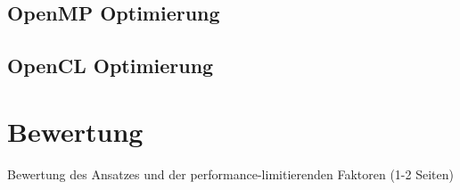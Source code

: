 \subsection*{OpenMP Optimierung}

\subsection*{OpenCL Optimierung}

\section{Bewertung}
Bewertung des Ansatzes und der performance-limitierenden Faktoren (1-2 Seiten)

